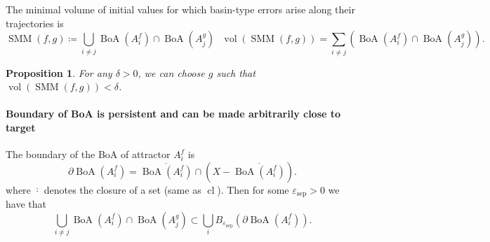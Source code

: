 \documentclass{article}
\newtheorem{proposition}{Proposition}
\theoremstyle{definition} \newtheorem{definition}{Definition}
\theoremstyle{remark} \newtheorem{remark}{Remark}
\newcommand{\cl}{\operatorname{cl}}
\newcommand{\vol}{\operatorname{vol}}
\newcommand{\boa}{\operatorname{BoA}}
\newcounter{ct}
\begin{document}
The minimal volume of initial values for which basin-type errors arise along their trajectories is 
\begin{equation}
\operatorname{SMM}(f,g) \coloneqq \bigcup_{i \neq j}\boa(A_i^f)\cap\boa(A_j^g) \ \ \  \vol \left(\operatorname{SMM}(f,g)\right) =  \sum_{i \neq j} \left(\boa(A_i^f)\cap\boa(A_j^g)\right).
\end{equation}


\begin{proposition}\label{prop:min_sep_bound}
For any $\delta>0$, we can choose $g$ such that $ \vol \left(\operatorname{SMM}(f,g)\right) <\delta$.
\end{proposition}


\paragraph{Boundary of BoA is persistent and can be made arbitrarily close to target}%
The boundary of the BoA of attractor $A_i^f$ is %
\[\partial\boa(A_i^f) = \overline{\boa(A_i^f)} \cap (X - \overline{\boa(A_i^f)}).\]
where \(\overline{\cdot}\) denotes the closure of a set (same as \(\cl\)). %
Then for some  $\varepsilon_{\operatorname{sep}}>0$ we have that 
\begin{equation}\label{eq:separatrixoverlap}
\bigcup_{i\neq j} \boa(A_i^f)\cap\boa(A_j^g) \subset \bigcup_i B_{\varepsilon_{\operatorname{sep}}}(\partial\boa(A_i^f)). 
\end{equation}

\end{document}
